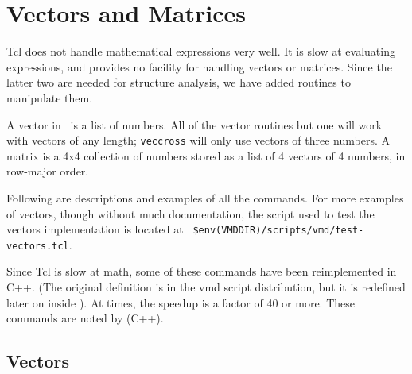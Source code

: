 \chapter{Vectors and Matrices}
\label{ug:topic:vectors}

Tcl does not handle mathematical expressions very well.  It is slow at
evaluating expressions, and provides no facility for handling vectors
or matrices.  Since the latter two are needed for structure analysis,
we have added routines to manipulate them.  

A vector in \VMD\ is a list of numbers.  All of the vector routines
but one will work with vectors of any length; {\tt veccross} will only
use vectors of three numbers.  A matrix is a 4x4 collection of numbers
stored as a list of 4 vectors of 4 numbers, in row-major order.

Following are descriptions and examples of all the commands.  For more
examples of vectors, though without much documentation, the script
used to test the vectors implementation is located at {\tt
\$env(VMDDIR)/scripts/vmd/test-vectors.tcl}.

Since Tcl is slow at math, some of these commands have been
reimplemented in C++.  (The original definition is in the vmd script
distribution, but it is redefined later on inside \VMD).  At times,
the speedup is a factor of 40 or more.  These commands are noted by
(C++).

\section{Vectors}


